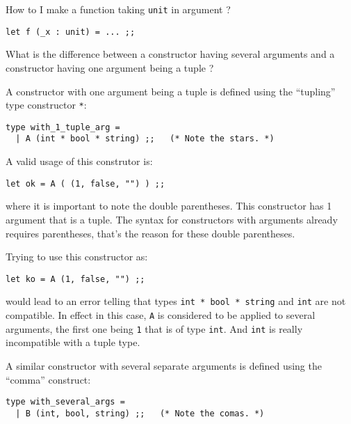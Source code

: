 \documentclass[10pt,a4paper]{article}
\begin{document}
\bigskip
\begin{faqitem}
How to I make a function taking {\tt unit} in argument ?

\medskip
{}
\lstinline"let f (_x : unit) = ... ;;"
\end{faqitem}



\bigskip
\begin{faqitem}
What is the difference between a constructor having several
arguments and a constructor having one argument being a tuple ?

\medskip
{}
A constructor with one argument being a tuple is defined using the ``tupling''
type constructor \lstinline{*}:
{\small
\begin{lstlisting}
type with_1_tuple_arg = 
  | A (int * bool * string) ;;   (* Note the stars. *)
\end{lstlisting}}

A valid usage of this construtor is:
{\small
\begin{lstlisting}
let ok = A ( (1, false, "") ) ;;
\end{lstlisting}}

\noindent where it is important to note the double parentheses. This
constructor has 1 argument that is a tuple. The syntax for constructors with
arguments already requires parentheses, that's the reason for these double
parentheses.

Trying to use this constructor as:

{\small
\begin{lstlisting}
let ko = A (1, false, "") ;;
\end{lstlisting}}

\noindent would lead to an error telling that types {\tt int * bool * string}
and {\tt int} are not compatible. In effect in this case, {\tt A} is
considered to be applied to several arguments, the first one being {\tt 1}
that is of type {\tt int}. And {\tt int} is really incompatible with a tuple
type.

A similar constructor with several separate arguments is defined using
the ``comma'' construct:

{\small
\begin{lstlisting}
type with_several_args =
  | B (int, bool, string) ;;   (* Note the comas. *)
\end{lstlisting}}


\end{faqitem}
\end{document}
